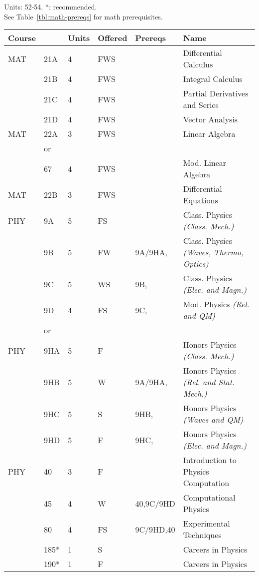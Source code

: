 \documentclass[12pt]{article}
\begin{document}
\newpage
\vskip 2cm
\vskip 0.25cm
\noindent
Units:  52-54. *: recommended.\\
See Table~\ref{tbl:math-prereqs} for math prerequisites.\\
\begin{tabular}{|llllll|}
\hline
Course & & Units & Offered & Prereqs & Name \\
\hline
MAT & 21A & 4 & FWS & & Differential Calculus\\ 
    & 21B & 4 & FWS &  & Integral Calculus \\ 
    & 21C & 4 & FWS &  & Partial Derivatives and Series\\ 
    & 21D & 4 & FWS &  & Vector Analysis\\
\hline
MAT & 22A & 3 & FWS &  & Linear Algebra\\
    & or  & & & & \\
    & 67  & 4 & FWS &  & Mod. Linear Algebra\\
\hline
MAT & 22B & 3 & FWS &  & Differential Equations\\ 
\hline
\hline

PHY & 9A & 5 & FS &  & Class. Physics {\it (Class. Mech.)}\\
& 9B & 5 & FW & 9A/9HA,    & Class. Physics {\it (Waves, Thermo, Optics)}\\
    & 9C & 5 & WS & 9B,  & Class. Physics {\it (Elec. and Magn.)}\\ 
    & 9D & 4 & FS & 9C, & Mod. Physics {\it (Rel. and QM)}\\ 
\hline
&or&&\\
\hline
PHY & 9HA & 5 & F &  & Honors Physics {\it (Class. Mech.)}\\ 
    & 9HB & 5 & W & 9A/9HA,  & Honors Physics {\it (Rel. and Stat. Mech.)}\\ 
    & 9HC & 5 & S & 9HB,  & Honors Physics {\it (Waves and QM)}\\ 
    & 9HD & 5 & F & 9HC,   & Honors Physics {\it (Elec. and Magn.)}\\ 
\hline
\hline
PHY & 40  & 3 & F & & Introduction to Physics Computation \\ 
    & 45  & 4 & W & 40,9C/9HD & Computational Physics\\ 
    & 80  & 4 & FS & 9C/9HD,40        & Experimental Techniques \\
    & 185* & 1 & S & & Careers in Physics \\ 
    & 190* & 1 & F & & Careers in Physics \\ 
\hline
\end{tabular}\\
\end{document}
